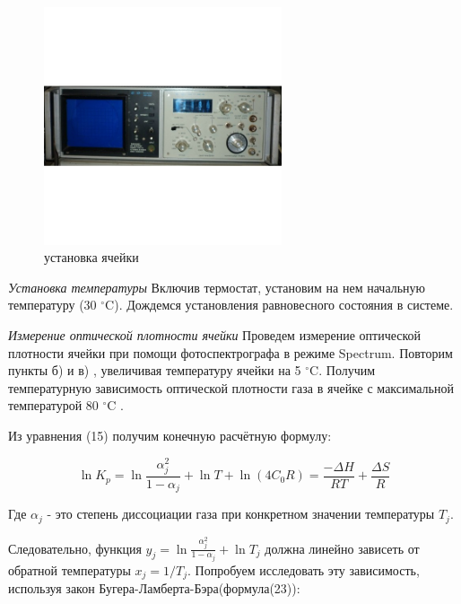 \documentclass[a4paper,12pt]{article} %
\begin{document}
\begin{figure}
	\begin{minipage}{0.45 \linewidth}
		\includegraphics[width = 7cm]{Images/Spectral analyzer SK4-56.jpg}
	\end{minipage}
	\caption{установка ячейки}
\end{figure}

\emph{Установка температуры}
Включив термостат, установим на нем начальную температуру (30 $^\circ$C). Дождемся установления равновесного состояния в системе.

\emph{Измерение оптической плотности ячейки}
Проведем измерение оптической плотности ячейки при помощи фотоспектрографа в режиме Spectrum. Повторим пункты б) и в) , увеличивая температуру ячейки на 5 $^\circ$C. Получим температурную зависимость оптической плотности газа в ячейке с максимальной температурой 80 $^\circ $C .

Из уравнения (15) получим конечную расчётную формулу:

\begin{equation}
\ln K_p = \ln \frac{ \alpha_j^2}{1 - \alpha_j} + \ln T + \ln (4C_0 R) = \frac{-\Delta H}{RT} + \frac{\Delta S}{R}
\end{equation}

Где $\alpha_j$ - это степень диссоциации газа при конкретном значении температуры $T_j$. 

Следовательно, функция $y_j =  \ln \frac{ \alpha_j^2}{1 - \alpha_j} + \ln T_j $ должна линейно зависеть от обратной температуры $x_j = 1/T_j$. 
Попробуем исследовать эту зависимость, используя закон Бугера-Ламберта-Бэра(формула(23)): 
\end{document}
